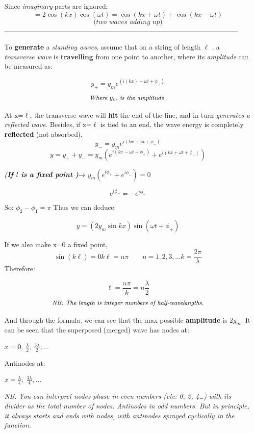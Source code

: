 \documentclass[12pt]{article}
\begin{document}
Since \textit{imaginary} parts are ignored:
\[
= 2\cos(kx)\cos(\omega t)
=\cos(kx + \omega t) + \cos(kx - \omega t)
\]
\[
\textit{(two waves adding up)}
\]
\noindent
------------------------------------------------------------------------------------------------------


To \textbf{generate} a \textit{standing waves}, assume that on a string of length $\ell$ , a \textit{transverse wave }is \textbf{travelling} from one point to another, where its \textit{amplitude} can be measured as:

\[y_+ = y_m  e^{(i(kx)- \omega t+ \phi_+)}\]
\[
\textit{\small Where  $y_m$  is the amplitude.}
\]

\noindent
At x=$\ell$, the transverse wave will \textbf{hit} the end of the line, and in turn \textit{generates a reflected wave.} Besides, if  x=$\ell$  is tied to an end, the wave energy is completely \textbf{reflected} (not absorbed).
\[
y_- = y_m e^{i(kx + \omega t + \phi_-)}
\]
\[
y = y_+ + y_- = y_m \left( e^{i(kx - \omega t + \phi_+)} + e^{i(kx + \omega t + \phi_-)} \right)
\]
{
\begin{center}   
\textit{(\textbf{If  $l$  is a fixed point )}}→ 
$y_m\left( e^{i\phi_+} + e^{i\phi_-} \right)=0$
\end{center} 
}
\[e^{i\phi_+} = - e^{i\phi_-}\]

So:
$\phi_2 - \phi_1 = \pi$
Thus we can deduce:

\[y = (2y_m \sin kx) \sin(\omega t + \phi_+)\]

If we also make x=0 a fixed point,
\[\sin(k\ell) = 0
k\ell = n\pi \qquad n = 1,2,3,\dots
k = \frac{2\pi}{\lambda}\]
\noindent
Therefore:

\[\ell = \frac{n\pi}{k} = n\frac{\lambda}{2}\]
\[\textit{\small NB: The length is integer numbers of half-wavelengths.}\]

And through the formula, we can see that the max possible \textbf{amplitude} is 2$y_m$. It can be seen that the superposed (merged) wave has nodes at:

$x = 0,\  \frac{\lambda}{2},\ \frac{3\lambda}{2},\dots$

Antinodes at:

$x = \frac{\lambda}{4},\; \frac{3\lambda}{4},\dots$


\textit{\small NB: You can interpret nodes phase in even numbers (etc: 0, 2, 4…) with its divider as the total number of nodes.
Antinodes in odd numbers.
But in principle, it always starts and ends with nodes, with antinodes sprayed cyclically in the function.
}
\end{document}
